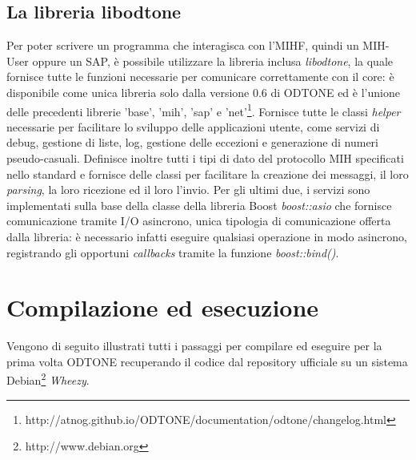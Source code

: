 \subsection{La libreria libodtone}
Per poter scrivere un programma che interagisca con l'MIHF, quindi un MIH-User oppure un SAP, è possibile utilizzare la libreria inclusa {\em libodtone}, la quale fornisce tutte le funzioni necessarie per comunicare correttamente con il core: è disponibile come unica libreria solo dalla versione 0.6 di ODTONE ed è l'unione delle precedenti librerie 'base', 'mih', 'sap' e 'net'\footnote{http://atnog.github.io/ODTONE/documentation/odtone/changelog.html}. Fornisce tutte le classi {\em helper} necessarie per facilitare lo sviluppo delle applicazioni utente, come servizi di debug, gestione di liste, log, gestione delle eccezioni e generazione di numeri pseudo-casuali. Definisce inoltre tutti i tipi di dato del protocollo MIH specificati nello standard e fornisce delle classi per facilitare la creazione dei messaggi, il loro {\em parsing}, la loro ricezione ed il loro l'invio. Per gli ultimi due, i servizi sono implementati sulla base della classe della libreria Boost {\em boost::asio} che fornisce comunicazione tramite I/O asincrono, unica tipologia di comunicazione offerta dalla libreria: è necessario infatti eseguire qualsiasi operazione in modo asincrono, registrando gli opportuni {\em callbacks} tramite la funzione {\em boost::bind()}.

\section{Compilazione ed esecuzione}
Vengono di seguito illustrati tutti i passaggi per compilare ed eseguire per la prima volta ODTONE recuperando il codice dal repository ufficiale su un sistema Debian\footnote{http://www.debian.org} {\em Wheezy}.

